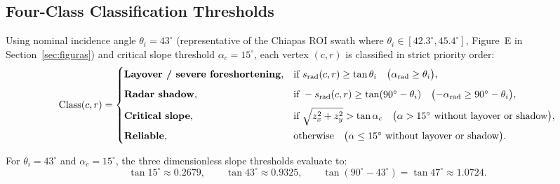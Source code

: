 \documentclass[11pt,a4paper]{article}
\begin{document}
\subsection{Four-Class Classification Thresholds}
\label{sec:relieve3d-clases-sar}

Using nominal incidence angle $\theta_i = 43^\circ$ (representative of the Chiapas ROI swath where $\theta_i\in[42.3^\circ,45.4^\circ]$, Figure~E in Section~\ref{sec:figuras}) and critical slope threshold $\alpha_c = 15^\circ$, each vertex $(c,r)$ is classified in strict priority order:
\begin{equation}
  \mathrm{Class}(c,r) =
  \begin{cases}
    \text{\textbf{Layover / severe foreshortening}}, &
      \text{if } s_{\mathrm{rad}}(c,r) \ge \tan\theta_i
      \quad\bigl(\alpha_{\mathrm{rad}} \ge \theta_i\bigr),\\[6pt]
    \text{\textbf{Radar shadow}}, &
      \text{if } -s_{\mathrm{rad}}(c,r) \ge \tan(90^\circ - \theta_i)
      \quad\bigl(-\alpha_{\mathrm{rad}} \ge 90^\circ - \theta_i\bigr),\\[6pt]
    \text{\textbf{Critical slope}}, &
      \text{if } \sqrt{z_x^2 + z_y^2} > \tan\alpha_c
      \quad\bigl(\alpha > 15^\circ\text{ without layover or shadow}\bigr),\\[6pt]
    \text{\textbf{Reliable}}, &
      \text{otherwise} \quad\bigl(\alpha \le 15^\circ\text{ without layover or shadow}\bigr).
  \end{cases}
  \label{eq:clasificacion-sar}
\end{equation}

For $\theta_i = 43^\circ$ and $\alpha_c = 15^\circ$, the three dimensionless slope thresholds evaluate to:
\begin{equation}
  \tan 15^\circ \approx 0.2679,
  \qquad
  \tan 43^\circ \approx 0.9325,
  \qquad
  \tan(90^\circ - 43^\circ) = \tan 47^\circ \approx 1.0724.
\end{equation}
\end{document}
